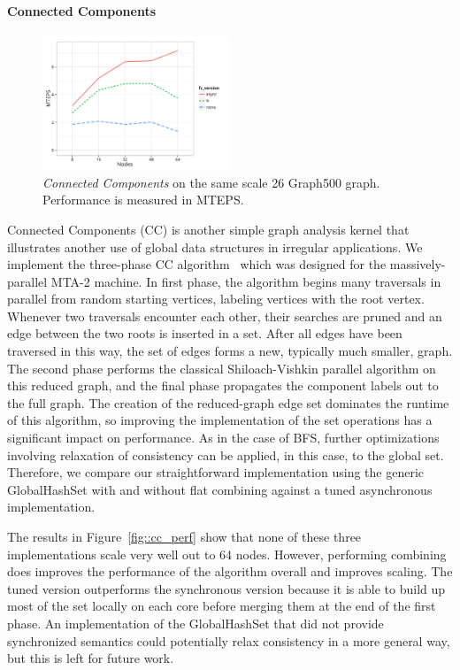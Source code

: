 \paragraph{Connected Components}
\begin{figure}[t]
  \centering
  \includegraphics[width=0.5\textwidth]{data/plots/cc_perf.pdf}
  \caption{\emph{Connected Components} on the same scale 26 Graph500 graph. Performance is measured in MTEPS.}
  \label{fig:cc_perf}
\end{figure}
Connected Components (CC) is another simple graph analysis kernel that illustrates another use of global data structures in irregular applications. We implement the three-phase CC algorithm~\cite{mtgl} which was designed for the massively-parallel MTA-2 machine. In first phase, the algorithm begins many traversals in parallel from random starting vertices, labeling vertices with the root vertex. Whenever two traversals encounter each other, their searches are pruned and an edge between the two roots is inserted in a set. After all edges have been traversed in this way, the set of edges forms a new, typically much smaller, graph. The second phase performs the classical Shiloach-Vishkin parallel algorithm\cite{shiloach1982n} on this reduced graph, and the final phase propagates the component labels out to the full graph.
The creation of the reduced-graph edge set dominates the runtime of this algorithm, so improving the implementation of the set operations has a significant impact on performance. As in the case of BFS, further optimizations involving relaxation of consistency can be applied, in this case, to the global set. Therefore, we compare our straightforward implementation using the generic GlobalHashSet with and without flat combining against a tuned asynchronous implementation.

The results in Figure~\ref{fig::cc_perf} show that none of these three implementations scale very well out to 64 nodes. However, performing combining does improves the performance of the algorithm overall and improves scaling. The tuned version outperforms the synchronous version because it is able to build up most of the set locally on each core before merging them at the end of the first phase. An implementation of the GlobalHashSet that did not provide synchronized semantics could potentially relax consistency in a more general way, but this is left for future work.
